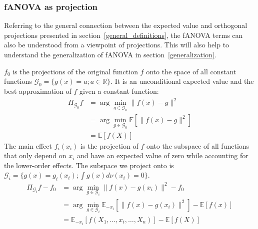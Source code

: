 

\subsubsection*{fANOVA as projection}
Referring to the general connection between the expected value and orthogonal projections presented in section~\ref{general_definitions}, the fANOVA terms can also be understood from a viewpoint of projections. This will also help to understand the generalization of fANOVA in section~\ref{generalization}.\par

$f_0$ is the projections of the original function $f$ onto the space of all constant functions $\mathcal{G}_0 = \{g(x) = a; a \in \mathbb{R}\}$. It is an unconditional expected value and the best approximation of $f$ given a constant function:
\begin{align*}
    \Pi_{\mathcal{G}_0}f
    &= \arg \min_{g \in \mathcal{G}_0} \|f(x) - g\|^2 \\
    &= \arg \min_{g \in \mathcal{G}_0} \mathbb{E}[\|f(x) - g\|^2] \\
    &= \mathbb{E}[f(X)]
\end{align*}
The main effect $f_i(x_i)$ is the projection of $f$ onto the subspace of all functions that only depend on $x_i$ and have an expected value of zero while accounting for the lower-order effects. The subspace we project onto is $\mathcal{G}_i = \{g(x) = g_i(x_i); \int g(x) d\nu (x_i) = 0\}$.
\begin{align*}
    \Pi_{\mathcal{G}_i}f - f_0
    &= \arg \min_{g \in \mathcal{G}_i} \|f(x) - g(x_i)\|^2 - f_0\\
    &= \arg \min_{g \in \mathcal{G}_i} \mathbb{E}_{-x_i}[\|f(x) - g(x_i)\|^2] - \mathbb{E}[f(x)] \\
    &= \mathbb{E}_{-x_i}[f(X_1, \dots, x_i, \dots, X_n)] - \mathbb{E}[f(X)]
\end{align*}

